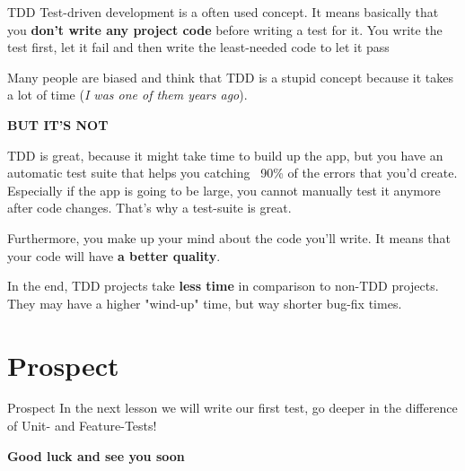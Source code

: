 \begin{frame}{TDD}
	Test-driven development is a often used concept. It means basically that you \textbf{don't write any project code} before writing a test for it. You write the test first, let it fail and then write the least-needed code to let it pass \pause 
	
	Many people are biased and think that TDD is a stupid concept because it takes a lot of time (\textit{I was one of them years ago}).\pause 
	
	\textbf{BUT IT'S NOT}	\pause
	
	TDD is great, because it might take time to build up the app, but you have an automatic test suite that helps you catching ~90\% of the errors that you'd create. Especially if the app is going to be large, you cannot manually test it anymore after code changes. That's why a test-suite is great.\pause
	
	 Furthermore, you make up your mind about the code you'll write. It means that your code will have \textbf{a better quality}.\pause
	 
	 In the end, TDD projects take \textbf{less time} in comparison to non-TDD projects. They may have a higher "wind-up" time, but way shorter bug-fix times.
\end{frame}

\section{Prospect}

\begin{frame}{Prospect}
	In the next lesson we will write our first test, go deeper in the difference of Unit- and Feature-Tests!
	
	\textbf{Good luck and see you soon} \pause
\end{frame}



